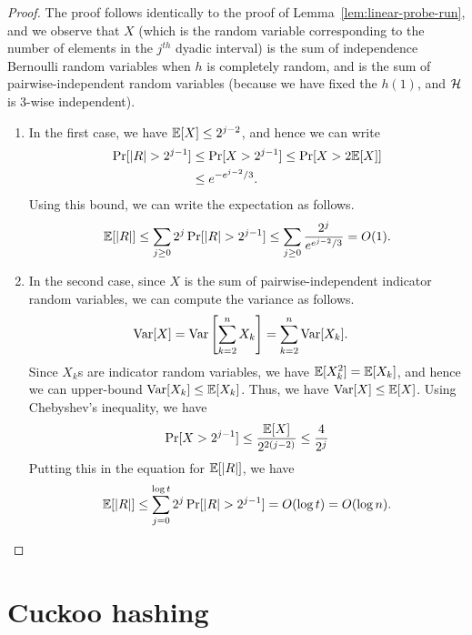 \begin{proof}
  The proof follows identically to the proof of
  Lemma~\ref{lem:linear-probe-run}, and we observe that $X$ (which is the random
  variable corresponding to the number of elements in the $j^{th}$ dyadic
  interval) is the sum of independence Bernoulli random variables when $h$ is
  completely random, and is the sum of pairwise-independent random variables
  (because we have fixed the $h(1)$, and ${\cal H}$ is 3-wise independent).

  \begin{enumerate}
  \item In the first case, we have $\mathbb{E}[X] \leq 2^{j-2}$, and hence we can write
    \begin{align*}
      \Pr[|R| > 2^{j-1}] &\leq \Pr[X > 2^{j-1}] \leq \Pr[ X > 2\mathbb{E}[X]]\\
      &\leq e^{-e^{j-2}/3}.
    \end{align*}
    Using this bound, we can write the expectation as follows.
    \begin{align*}
      \mathbb{E}[|R|] \leq \sum_{j\geq 0} 2^j \Pr[|R| > 2^{j-1}] \leq \sum_{j \geq 0} \frac{2^j}{e^{e^{j-2}/3}} = O(1).
    \end{align*}
  \item In the second case, since $X$ is the sum of pairwise-independent
    indicator random variables, we can compute the variance as follows.
    \begin{align*}
      \operatorname{Var}[X] &= \operatorname{Var}\left[\sum_{k=2}^n X_k \right] = \sum_{k=2}^n \operatorname{Var}[X_k].
    \end{align*}
    Since $X_k$s are indicator random variables, we have $\mathbb{E}[X_k^2] = \mathbb{E}[X_k]$,
    and hence we can upper-bound $\operatorname{Var}[X_k] \leq \mathbb{E}[X_k]$. Thus, we have
    $\operatorname{Var}[X] \leq \mathbb{E}[X]$. Using Chebyshev's inequality, we have
    \begin{align*}
      \Pr[X > 2^{j-1}] \leq \frac{\mathbb{E}[X]}{2^{2(j-2)}} \leq \frac{4}{2^j}
    \end{align*}
    Putting this in the equation for $\mathbb{E}[|R|]$, we have
    \begin{align*}
      \mathbb{E}[|R|] \leq \sum_{j=0}^{\log t} 2^j \Pr[|R| > 2^{j-1}] = O(\log t) = O(\log n).
    \end{align*}
  \end{enumerate}
\end{proof}


\section{Cuckoo hashing}

